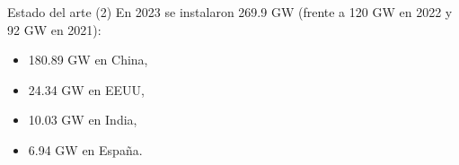 \documentclass[aspectratio=169, usenames,svgnames,dvipsnames]{beamer}
\begin{document}
\begin{frame}[label={sec:org09730ba}]{Estado del arte (2)}
En 2023 se instalaron 269.9 GW  (frente a 120 GW en 2022 y 92 GW en 2021):
\begin{itemize}
\item 180.89 GW en China,
\item 24.34 GW en EEUU,
\item 10.03 GW en India,
\item 6.94 GW en España.
\end{itemize}
\end{frame}
\end{document}
